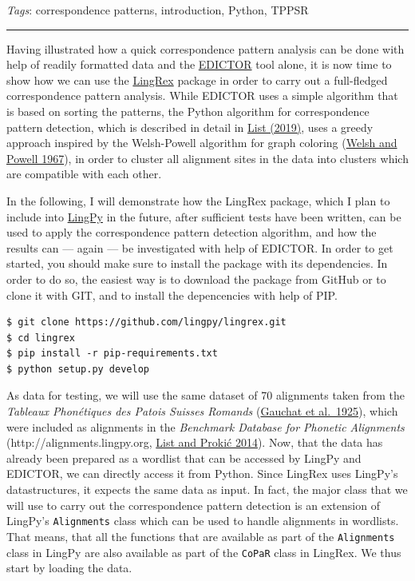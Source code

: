 \documentclass[
  a4paper,
  14pt,
  oneside,
  tablecaptionabove
]{scrbook}
\newcommand{\passthrough}[1]{#1}
\begin{document}
\emph{Tags}: correspondence patterns, introduction, Python, TPPSR

\begin{center}\rule{0.5\linewidth}{1pt}\end{center}


Having illustrated how a quick correspondence pattern analysis can be
done with help of readily formatted data and the
\href{http://edictor.digling.org}{EDICTOR} tool alone, it is now time to
show how we can use the
\href{https://github.com/lingpy/lingrex}{LingRex} package in order to
carry out a full-fledged correspondence pattern analysis. While EDICTOR
uses a simple algorithm that is based on sorting the patterns, the
Python algorithm for correspondence pattern detection, which is
described in detail in
\href{http://bibliography.lingpy.org?key=List2019a}{List (2019)}, uses
a greedy approach inspired by the Welsh-Powell algorithm for graph
coloring (\href{http://bibliography.lingpy.org?key=Welsh1967}{Welsh and
Powell 1967}), in order to cluster all alignment sites in the data into
clusters which are compatible with each other.

In the following, I will demonstrate how the LingRex package, which I
plan to include into \href{http://lingpy.org}{LingPy} in the future,
after sufficient tests have been written, can be used to apply the
correspondence pattern detection algorithm, and how the results can ---
again --- be investigated with help of EDICTOR. In order to get started,
you should make sure to install the package with its dependencies. In
order to do so, the easiest way is to download the package from GitHub
or to clone it with GIT, and to install the depencencies with help of
PIP.

\begin{lstlisting}
$ git clone https://github.com/lingpy/lingrex.git
$ cd lingrex
$ pip install -r pip-requirements.txt
$ python setup.py develop
\end{lstlisting}

As data for testing, we will use the same dataset of 70 alignments taken
from the \emph{Tableaux Phonétiques des Patois Suisses Romands} (\href{http://bibliography.lingpy.org?key=Gauchat1925}{Gauchat et
al.~1925}), which were included as alignments in the \emph{Benchmark
Database for Phonetic Alignments} (http://alignments.lingpy.org,
\href{http://bibliography.lingpy.org?key=List2014e}{List and Prokić
2014}). Now, that the data has already been prepared as a wordlist that
can be accessed by LingPy and EDICTOR, we can directly access it from
Python. Since LingRex uses LingPy's datastructures, it expects the same
data as input. In fact, the major class that we will use to carry out
the correspondence pattern detection is an extension of LingPy's
\passthrough{\lstinline!Alignments!} class which can be used to handle
alignments in wordlists. That means, that all the functions that are
available as part of the \passthrough{\lstinline!Alignments!} class in
LingPy are also available as part of the \passthrough{\lstinline!CoPaR!}
class in LingRex. We thus start by loading the data.
\end{document}

